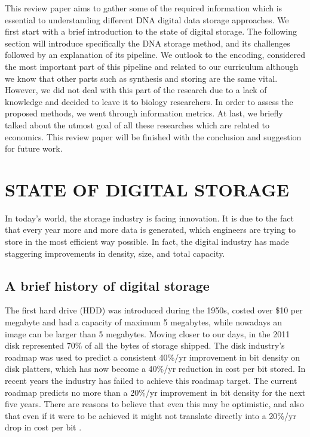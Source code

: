 \documentclass[10pt,twocolumn,twoside]{gsajnl}
\begin{document}
This review paper aims to gather some of the required information which is essential to understanding different DNA digital data storage approaches. We first start with a brief introduction to the state of digital storage. The following section will introduce specifically the DNA storage method, and its challenges followed by an explanation of its pipeline. We outlook to the encoding, considered the most important part of this pipeline and related to our curriculum although we know that other parts such as synthesis and storing are the same vital. 
However, we did not deal with this part of the research due to a lack of knowledge and decided to leave it to biology researchers. In order to assess the proposed methods, we went through information metrics. At last, we briefly talked about the utmost goal of all these researches which are related to economics. This review paper will be finished with the conclusion and suggestion for future work. 
\section{STATE OF DIGITAL STORAGE}
\label{sec:STATE OF DIGITAL STORAGE}
In today's world, the storage industry is facing innovation. It is due to the fact that every year more and more data is generated, which engineers are trying to store in the most efficient way possible.
In fact, the digital industry has made staggering improvements in density, size, and total capacity.
\subsection{A brief history of digital storage}
The first hard drive (HDD) was introduced during the 1950s, costed over \$10 per megabyte and had a capacity of maximum 5 megabytes, while nowadays an image can be larger than 5 megabytes. 
Moving closer to our days, in the 2011 disk represented 70\% of all the bytes of storage shipped. The disk industry’s roadmap was used to predict a consistent 40\%/yr improvement in bit density on disk platters, which has now become a 40\%/yr reduction in cost per bit stored. In recent years the industry has failed to achieve this roadmap target. The current roadmap predicts no more than a 20\%/yr improvement in bit density for the next five years. There are reasons to believe that even this may be optimistic, and also that even if it were to be achieved it might not translate directly into a 20\%/yr drop in cost per bit \cite{rosenthal2012economics}.
\end{document}

